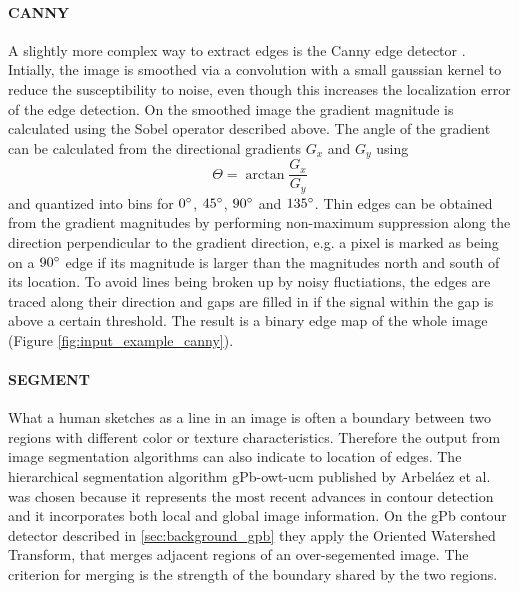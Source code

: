 \paragraph{CANNY}

A slightly more complex way to extract edges is the Canny edge detector
\autocite{canny_computational_1986}. Intially, the image is smoothed via a
convolution with a small gaussian kernel to reduce the susceptibility to noise,
even though this increases the localization error of the edge detection. On the
smoothed image the gradient magnitude is calculated using the Sobel operator
described above. The angle of the gradient can be calculated from the
directional gradients $G_x$ and $G_y$ using
\begin{equation*}
    \Theta = \arctan{\frac{G_x}{G_y}}
\end{equation*}
and quantized into bins for $0 \degree$, $45 \degree$, $90 \degree$ and $135
\degree$. Thin edges can be obtained from the gradient magnitudes by performing
non-maximum suppression along the direction perpendicular to the gradient
direction, e.g. a pixel is marked as being on a $90 \degree$ edge if its
magnitude is larger than the magnitudes north and south of its location. To
avoid lines being broken up by noisy fluctiations, the edges are traced along
their direction and gaps are filled in if the signal within the gap is above a
certain threshold. The result is a binary edge map of the whole image (Figure
\ref{fig:input_example_canny}).

\paragraph{SEGMENT}

What a human sketches as a line in an image is often a boundary between two
regions with different color or texture characteristics. Therefore the output
from image segmentation algorithms can also indicate to location of edges. The
hierarchical segmentation algorithm gPb-owt-ucm published by Arbeláez et al.\ 
\autocite{arbelaez_contours_2009} \autocite{arbelaez_contour_2011} was chosen
because it represents the most recent advances in contour detection and it
incorporates both local and global image information. On the gPb contour
detector described in \ref{sec:background_gpb} they apply the Oriented
Watershed Transform, that merges adjacent regions of an over-segemented image.
The criterion for merging is the strength of the boundary shared by the two
regions.

